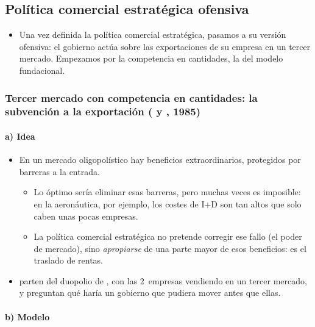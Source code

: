 \documentclass[11pt]{article}
\begin{document}
\subsection{Política comercial estratégica ofensiva}\label{sec:ofensiva}

\begin{itemize}
\item Una vez definida la política comercial estratégica, pasamos a su versión ofensiva: el gobierno actúa sobre las exportaciones de su empresa en un tercer mercado. Empezamos por la competencia en cantidades, la del modelo fundacional.
\end{itemize}

\subsubsection{Tercer mercado con competencia en cantidades: la subvención a la exportación ( y , 1985)}\label{sec:brander-spencer}

\paragraph{a) Idea}

\begin{itemize}
\item En un mercado oligopolístico hay beneficios extraordinarios, protegidos por barreras a la entrada.
  \begin{itemize}
  \item Lo óptimo sería eliminar esas barreras, pero muchas veces es imposible: en la aeronáutica, por ejemplo, los costes de I+D son tan altos que solo caben unas pocas empresas.
  \item La política comercial estratégica no pretende corregir ese fallo (el poder de mercado), sino \emph{apropiarse} de una parte mayor de esos beneficios: es el traslado de rentas.
  \end{itemize}
\item \textcite{BranderSpencer1985Export} parten del duopolio de  , con las 2~empresas vendiendo en un tercer mercado, y preguntan qué haría un gobierno que pudiera mover antes que ellas.
\end{itemize}

\paragraph{b) Modelo}
\end{document}
